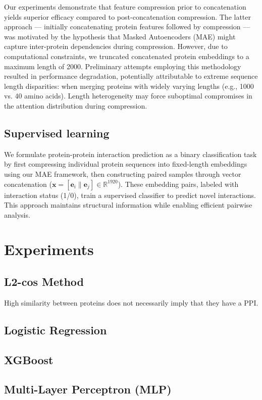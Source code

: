 \documentclass{article}
\begin{document}
 Our experiments demonstrate that {feature compression prior to concatenation yields superior efficacy} compared to post-concatenation compression. The latter approach — initially concatenating protein features followed by compression — was motivated by the hypothesis that Masked Autoencoders (MAE) might capture inter-protein dependencies during compression. However, due to computational constraints, we truncated concatenated protein embeddings to a maximum length of 2000. Preliminary attempts employing this methodology resulted in performance degradation, potentially attributable to extreme sequence length disparities: when merging proteins with widely varying lengths (e.g., 1000 vs. 40 amino acids). Length heterogeneity may force suboptimal compromises in the attention distribution during compression.  
	
	
	\subsection{Supervised learning}

 We formulate protein-protein interaction prediction as a binary classification task by first compressing individual protein sequences into fixed-length embeddings using our MAE framework, then constructing paired samples through vector concatenation ($\mathbf{x} = [\mathbf{e}_i \|\mathbf{e}_j] \in \mathbb{R}^{1920}$). These embedding pairs, labeled with interaction status (1/0), train a supervised classifier to predict novel interactions. This approach maintains structural information while enabling efficient pairwise analysis.
	
	\section{Experiments}
	
	\subsection{L2-cos Method}
	High similarity between proteins does not necessarily imply that they have a PPI.
	
	\subsection{Logistic Regression}
	\subsection{XGBoost}
	\subsection{Multi-Layer Perceptron (MLP)}
	
\end{document}
